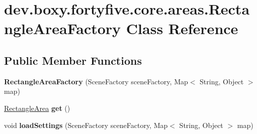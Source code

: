\hypertarget{classdev_1_1boxy_1_1fortyfive_1_1core_1_1areas_1_1_rectangle_area_factory}{
\section{dev.boxy.fortyfive.core.areas.RectangleAreaFactory Class Reference}
\label{d8/d89/classdev_1_1boxy_1_1fortyfive_1_1core_1_1areas_1_1_rectangle_area_factory}
}
\subsection*{Public Member Functions}
\begin{DoxyCompactItemize}
\item 
\hypertarget{classdev_1_1boxy_1_1fortyfive_1_1core_1_1areas_1_1_rectangle_area_factory_a131ccc86acd874193ada75809be7fd40}{
{\bfseries RectangleAreaFactory} (SceneFactory sceneFactory, Map$<$ String, Object $>$ map)}
\label{d8/d89/classdev_1_1boxy_1_1fortyfive_1_1core_1_1areas_1_1_rectangle_area_factory_a131ccc86acd874193ada75809be7fd40}

\item 
\hypertarget{classdev_1_1boxy_1_1fortyfive_1_1core_1_1areas_1_1_rectangle_area_factory_a4235445b9bcb1d1339b40c6a18164f7c}{
\hyperlink{classdev_1_1boxy_1_1fortyfive_1_1core_1_1areas_1_1_rectangle_area}{RectangleArea} {\bfseries get} ()}
\label{d8/d89/classdev_1_1boxy_1_1fortyfive_1_1core_1_1areas_1_1_rectangle_area_factory_a4235445b9bcb1d1339b40c6a18164f7c}

\item 
\hypertarget{classdev_1_1boxy_1_1fortyfive_1_1core_1_1areas_1_1_rectangle_area_factory_a9fbb20e08786c3777d90ae3ea2ef1c12}{
void {\bfseries loadSettings} (SceneFactory sceneFactory, Map$<$ String, Object $>$ map)}
\label{d8/d89/classdev_1_1boxy_1_1fortyfive_1_1core_1_1areas_1_1_rectangle_area_factory_a9fbb20e08786c3777d90ae3ea2ef1c12}

\end{DoxyCompactItemize}
